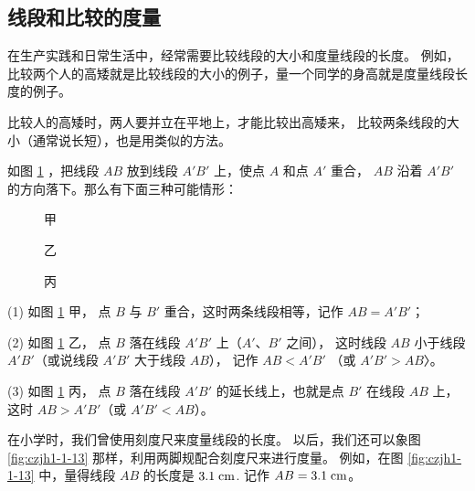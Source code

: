 \subsection{线段和比较的度量}\label{subsec:czjh1-1-3}

在生产实践和日常生活中，经常需要比较线段的大小和度量线段的长度。
例如，比较两个人的高矮就是比较线段的大小的例子，量一个同学的身高就是度量线段长度的例子。

比较人的高矮时，两人要并立在平地上，才能比较出高矮来，
比较两条线段的大小（通常说长短），也是用类似的方法。

如图 \ref{fig:czjh1-1-12} ，把线段 $AB$ 放到线段 $A'B'$ 上，使点 $A$ 和点 $A'$ 重合，
$AB$ 沿着 $A'B'$ 的方向落下。那么有下面三种可能情形：

\begin{figure}[htbp]
    \centering
    \begin{minipage}[b]{4cm}
        \centering
        
        \caption*{甲}
    \end{minipage}
    \qquad
    \begin{minipage}[b]{4cm}
        \centering
        
        \caption*{乙}
    \end{minipage}
    \qquad
    \begin{minipage}[b]{4cm}
        \centering
        
        \caption*{丙}
    \end{minipage}
    \caption{}\label{fig:czjh1-1-12}
\end{figure}

(1) 如图 \ref{fig:czjh1-1-12} 甲， 点 $B$ 与 $B'$ 重合，这时两条线段相等，记作 $AB = A'B'$；

(2) 如图 \ref{fig:czjh1-1-12} 乙， 点 $B$ 落在线段 $A'B'$ 上（$A'$、$B'$ 之间），
这时线段 $AB$ 小于线段 $A'B'$（或说线段 $A'B'$ 大于线段 $AB$），
记作 $AB < A'B'$ （或 $A'B' > AB$〉。

(3) 如图 \ref{fig:czjh1-1-12} 丙， 点 $B$ 落在线段 $A'B'$ 的延长线上，也就是点 $B'$ 在线段 $AB$ 上，
这时 $AB > A'B'$（或 $A'B' < AB$）。

在小学时，我们曾使用刻度尺来度量线段的长度。
以后，我们还可以象图 \ref{fig:czjh1-1-13} 那样，利用两脚规配合刻度尺来进行度量。
例如，在图 \ref{fig:czjh1-1-13} 中，量得线段 $AB$ 的长度是 $3.1 \; \mathord{\text{cm}}$. 记作 $AB = 3.1 \; \mathord{\text{cm}}$。

